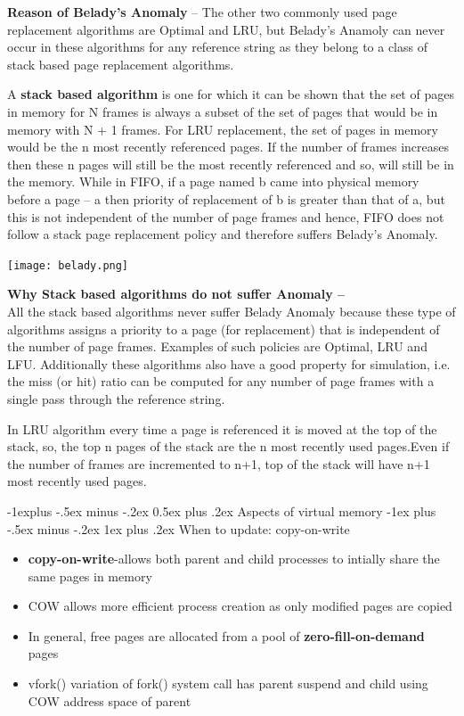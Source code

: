\documentclass[8pt,landscape]{article}
\makeatletter
\renewcommand{\subsection}{\@startsection{subsection}{2}{0mm}%
                                {-1explus -.5ex minus -.2ex}%
                                {0.5ex plus .2ex}%
                                {\normalfont\scriptsize\bfseries}}
\renewcommand{\subsubsection}{\@startsection{subsubsection}{3}{0mm}%
                                {-1ex plus -.5ex minus -.2ex}%
                                {1ex plus .2ex}%
                                {\normalfont\tiny\bfseries}}
\makeatother
\begin{document}
\begin{multicols}{3}
\begin{tiny}
		\textbf{Reason of Belady’s Anomaly} –
The other two commonly used page replacement algorithms are Optimal and LRU, but Belady’s Anamoly can never occur in these algorithms for any reference string as they belong to a class of stack based page replacement algorithms.

A \textbf{stack based algorithm} is one for which it can be shown that the set of pages in memory for N frames is always a subset of the set of pages that would be in memory with N + 1 frames. For LRU replacement, the set of pages in memory would be the n most recently referenced pages. If the number of frames increases then these n pages will still be the most recently referenced and so, will still be in the memory. While in FIFO, if a page named b came into physical memory before a page – a then priority of replacement of b is greater than that of a, but this is not independent of the number of page frames and hence, FIFO does not follow a stack page replacement policy and therefore suffers Belady’s Anomaly.

			\begingroup
				\centering
				\texttt{[image: belady.png]}
			\endgroup

			\textbf{Why Stack based algorithms do not suffer Anomaly –}\\
All the stack based algorithms never suffer Belady Anomaly because these type of algorithms assigns a priority to a page (for replacement) that is independent of the number of page frames. Examples of such policies are Optimal, LRU and LFU. Additionally these algorithms also have a good property for simulation, i.e. the miss (or hit) ratio can be computed for any number of page frames with a single pass through the reference string.

In LRU algorithm every time a page is referenced it is moved at the top of the stack, so, the top n pages of the stack are the n most recently used pages.Even if the number of frames are incremented to n+1, top of the stack will have n+1 most recently used pages.
	
	\subsection{Aspects of virtual memory}
		\subsubsection{When to update: copy-on-write}
		\begin{itemize}[noitemsep]
			\item \textbf{copy-on-write}-allows both parent and child processes to intially 
				share the same pages in memory
			\item COW allows more efficient process creation as only modified pages are copied
			\item In general, free pages are allocated from a pool of 
				\textbf{zero-fill-on-demand} pages
			\item vfork() variation of fork() system call has parent suspend and child using COW
				address space of parent
		\end{itemize}

\end{tiny}
\end{multicols}
\end{document}
